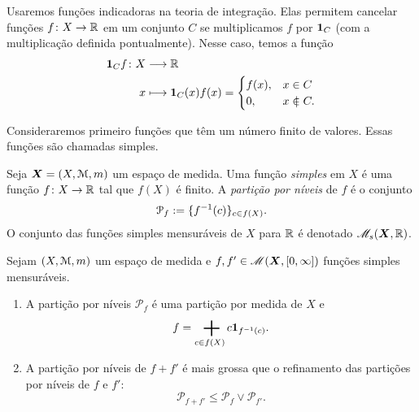 
Usaremos funções indicadoras na teoria de integração. Elas permitem cancelar funções $f\colon X \to \mathbb{R}$ em um conjunto $C$ se multiplicamos $f$ por ${\bm 1}_C$ (com a multiplicação definida pontualmente). Nesse caso, temos a função
	\begin{align*}
	\func{\idc_Cf}{X}{\R}{x}{\idc_C(x)f(x)=
		\begin{cases}
			f(x),& x \in C \\
			0,& x \notin C.
		\end{cases}
	}
	\end{align*}

Consideraremos primeiro funções que têm um número finito de valores. Essas funções são chamadas simples.

\begin{definition}
Seja $\bm X = (X,\mathcal{M},m)$ um espaço de medida. Uma função \emph{simples} em $X$ é uma função $f\colon X \to \mathbb{R}$ tal que $f(X)$ é finito. A \emph{partição por níveis} de $f$ é o conjunto
	\begin{equation*}
	\mathcal P_f := \{f^{-1}(c)\}_{c \in f(X)}.
	\end{equation*}
O conjunto das funções simples mensuráveis de $X$ para $\mathbb{R}$ é denotado $\mathscr{M}_s(\bm X,\mathbb{R})$.
\end{definition}

\begin{proposition}
Sejam $(X,\mathcal{M},m)$ um espaço de medida e $f,f' \in \mathscr{M}(\bm X,\left[{0},{\infty}\right])$ funções simples mensuráveis.
	\begin{enumerate}
	\item A partição por níveis $\mathcal P_f$ é uma partição por medida de $X$ e 
		\begin{equation*}
		f = \sum_{c \in f(X)} c \idc_{f\inv(c)}.
		\end{equation*}

	\item A partição por níveis de $f+f'$ é mais grossa que o refinamento das partições por níveis de $f$ e $f'$:
		\begin{equation*}
		\mathcal P_{f+f'} \leq \mathcal P_f \vee \mathcal P_{f'}.
		\end{equation*}
	\end{enumerate}
\end{proposition}


